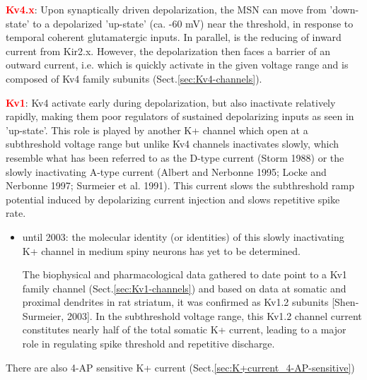 \textcolor{red}{\bf Kv4.x}: Upon synaptically driven depolarization, the MSN can
move from 'down-state' to a depolarized 'up-state' (ca. -60 mV) near the
threshold, in response to temporal coherent glutamatergic inputs. In parallel,
is the reducing of inward current from Kir2.x. However, the depolarization then
faces a barrier of an outward current, i.e. which is quickly activate in the
given voltage range and is composed of Kv4 family subunits
(Sect.\ref{sec:Kv4-channels}).

\textcolor{red}{\bf Kv1}:
Kv4 activate early during depolarization, but also inactivate relatively
rapidly, making them poor regulators of sustained depolarizing inputs as seen in
'up-state'. This role is played by another K+ channel which open at a
subthreshold voltage range but unlike Kv4 channels inactivates slowly, which
resemble what has been referred to as the D-type current (Storm 1988) or the
slowly inactivating A-type current (Albert and Nerbonne 1995; Locke and Nerbonne
1997; Surmeier et al. 1991). This current slows the subthreshold ramp potential
induced by depolarizing current injection and slows repetitive spike rate.
\begin{itemize}

  \item until 2003: the molecular identity (or identities) of this slowly inactivating
 K+ channel in medium spiny neurons has yet to be determined.

The biophysical and pharmacological data gathered to date point to a Kv1 family
channel (Sect.\ref{sec:Kv1-channels}) and based on data at somatic and proximal
dendrites in rat striatum, it was confirmed as Kv1.2 subunits [Shen- Surmeier,
2003].
In the subthreshold voltage range, this Kv1.2 channel current constitutes nearly
half of the total somatic K+ current, leading to a major role in regulating
spike threshold and repetitive discharge.




\end{itemize}

There are also 4-AP sensitive K+ current (Sect.\ref{sec:K+current_4-AP-sensitive})


